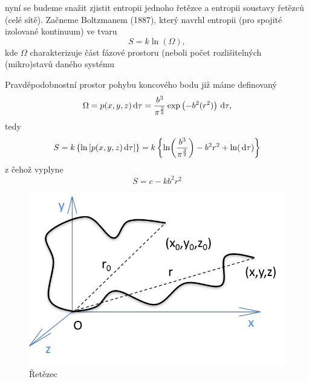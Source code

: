 nyní se budeme snažit zjistit entropii jednoho řetězce a entropii soustavy řetězců (celé sítě). Začneme Boltzmanem (1887), který navrhl entropii (pro spojité izolované kontinuum) ve tvaru
\begin{equation}
	S = k \ln(\Omega),
\end{equation}
kde $\Omega$ charakterizuje část fázové prostoru (neboli počet rozlišitelných (mikro)stavů daného systému

Pravděpodobnostní prostor pohybu koncového bodu již máme definovaný
\begin{equation}
	\Omega = p(x,y,z) \,\mathrm{d} \tau
	= \frac{b^3}{\pi^{\frac{3}{2}}} \exp\left(-b^2(r^2)\right) \,\mathrm{d} \tau,
\end{equation}
tedy
\begin{equation}
	S
	= k \left\{\ln\left[p(x,y,z) \,\mathrm{d} \tau\right]\right\}
	= k \left\{\ln\!\left(\frac{b^3}{\pi^{\frac{3}{2}}}\right) - b^2 r^2 + \ln(\,\mathrm{d} \tau)\right\}
\end{equation}
z čehož vyplyne
\begin{equation}
	S = c - k b^2 r^2
\end{equation}

\begin{figure}[H]
	\centering
	\includegraphics{Obrazky/neo-hooke-entropie}
	\caption{Řetězec}
	\label{fig:neo-hooke-entropie}
\end{figure}


